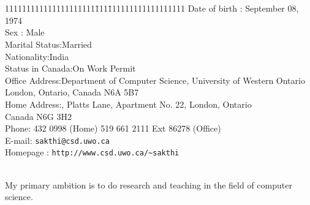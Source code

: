 \documentclass[11pt]{article}
\begin{document}
\thispagestyle{empty}
 \ \\\\
\begin{tabbing}111111111111111111111\=111\=111111111111111111 \kill
Date of birth \>:\> September 08, 1974\\
Sex \>:\> Male\\
Marital Status\>:\>Married\\
Nationality\>:\>India\\
Status in Canada\>:\>On Work Permit\\
Office Address\>:\>Department of Computer Science, University of
Western Ontario\\
\>\> London, Ontario, Canada N6A 5B7\\
Home Address\>:, Platts Lane, Apartment No. 22, London, Ontario\\
\>\> Canada N6G 3H2\\
Phone\>: 432 0998 (Home) 519 661 2111 Ext 86278 (Office)\\
E-mail\>:\> \verb+sakthi@csd.uwo.ca+\\
Homepage \>:\> \verb+http://www.csd.uwo.ca/~sakthi+ 
\end{tabbing}

\vspace{0.5cm}

\\

My primary ambition is to do research and teaching in the field of computer science. 

\vspace{0.5cm}
\end{document}
